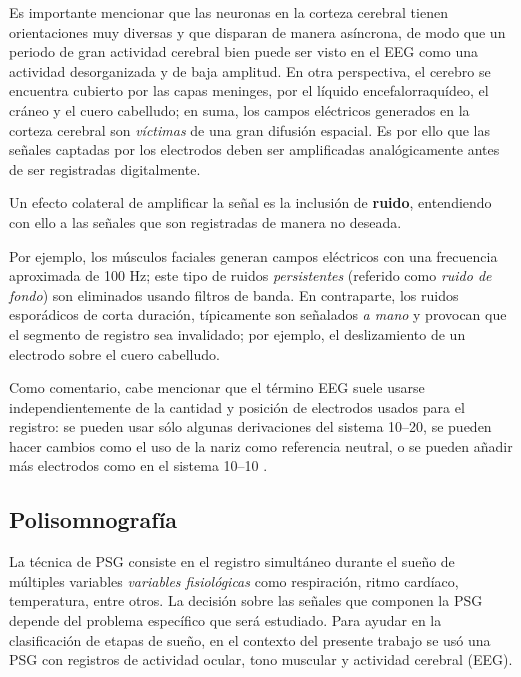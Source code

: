 \documentclass[12pt,letterpaper]{book}
\newcommand{\hz}{\si{\hertz}\xspace}
\begin{document}
Es importante mencionar que las neuronas en la corteza cerebral tienen orientaciones muy diversas y que disparan de manera asíncrona, de modo que un periodo de gran actividad cerebral bien puede ser visto en el EEG como una actividad desorganizada y de baja amplitud.
%
En otra perspectiva, el cerebro se encuentra cubierto por las capas meninges, por el líquido encefalorraquídeo, el cráneo y el cuero cabelludo; en suma, los campos eléctricos generados en la corteza cerebral son \textit{víctimas} de una gran difusión espacial.
%
Es por ello que las señales captadas por los electrodos deben ser amplificadas analógicamente antes de ser registradas digitalmente.

Un efecto colateral de amplificar la señal es la inclusión de \textbf{ruido}, entendiendo con ello a las señales que son registradas de manera no deseada.

Por ejemplo, los músculos faciales generan campos eléctricos con una frecuencia aproximada de 100 \hz; este tipo de ruidos \textit{persistentes} (referido como \textit{ruido de fondo}) son eliminados usando filtros de banda.
%
En contraparte, los ruidos esporádicos de corta duración, típicamente son señalados \textit{a mano} y provocan que el segmento de registro sea invalidado; por ejemplo, el deslizamiento de un electrodo sobre el cuero cabelludo.

Como comentario, cabe mencionar que el término EEG suele usarse independientemente de la cantidad y posición de electrodos usados para el registro: se pueden usar sólo algunas derivaciones del sistema 10--20, se pueden hacer cambios como el uso de la nariz como referencia neutral, o se pueden añadir más electrodos como en el sistema 10--10 \cite{Klem99}. 


\subsection{Polisomnografía}
\label{sec:emg_eog}

La técnica de PSG consiste en el registro simultáneo durante el sueño de múltiples variables \textit{variables fisiológicas} como respiración, ritmo cardíaco, temperatura, entre otros.
%
La decisión sobre las señales que componen la PSG depende del problema específico que será estudiado.
%
Para ayudar en la clasificación de etapas de sueño, en el contexto del presente trabajo se usó una PSG con registros de actividad ocular, tono muscular y actividad cerebral (EEG).
\end{document}
